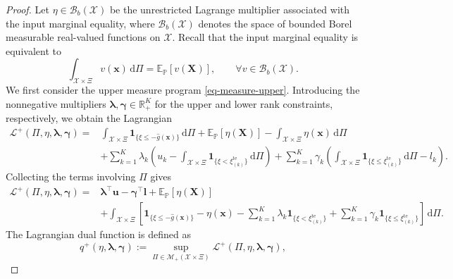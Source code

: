 \documentclass[review,11pt,3p,authoryear,nopreprintline]{elsarticle}
\begin{document}
\begin{proof}
  Let $\eta\in\mathcal B_b(\mathcal X)$ be the unrestricted Lagrange multiplier associated with the input marginal equality, where $\mathcal B_b(\mathcal X)$ denotes the space of bounded Borel measurable real-valued functions on $\mathcal X$. Recall that the input marginal equality is equivalent to
  \begin{equation*}
    \int_{\mathcal X\times\Xi}v(\bm x)\,\mathrm d\Pi
    =\mathbb E_{\mathbb P}\left[v(\bm X)\right],
    \qquad\forall v\in\mathcal B_b(\mathcal X).
  \end{equation*}
  We first consider the upper measure program \eqref{eq-measure-upper}. Introducing the nonnegative multipliers $\bm\lambda,\bm\gamma\in\mathbb R_+^K$ for the upper and lower rank constraints, respectively, we obtain the Lagrangian \citep[Section~5.1]{B.V04}
  \begin{equation}
    \begin{aligned}
      \mathcal L^+(\Pi,\eta,\bm\lambda,\bm\gamma) = & \int_{\mathcal X\times\Xi}\mathbf1_{\{\xi\le-\hat g(\bm x)\}}\,\mathrm d\Pi +\mathbb E_{\mathbb P}\left[\eta(\bm X)\right]-\int_{\mathcal X\times\Xi}\eta(\bm x)\,\mathrm d\Pi\\
      &+\sum_{k=1}^K\lambda_k\left(u_k-\int_{\mathcal X\times\Xi}\mathbf1_{\{\xi<\xi_{(k)}^{\mathrm{te}}\}}\,\mathrm d\Pi\right) +\sum_{k=1}^K\gamma_k\left(\int_{\mathcal X\times\Xi}\mathbf1_{\{\xi\le\xi_{(k)}^{\mathrm{te}}\}}\,\mathrm d\Pi-l_k\right).
    \end{aligned}
    \label{eq-upper-lagrangian-expanded}
  \end{equation}
  Collecting the terms involving $\Pi$ gives
  \begin{equation}
    \begin{aligned}
      \mathcal L^+(\Pi,\eta,\bm\lambda,\bm\gamma)
      ={}&\bm\lambda^\top\bm u-\bm\gamma^\top\bm l+\mathbb E_{\mathbb P}\left[\eta(\bm X)\right]\\
      &+\int_{\mathcal X\times\Xi}\left[ \mathbf1_{\{\xi\le-\hat g(\bm x)\}}-\eta(\bm x) -\sum_{k=1}^K\lambda_k\mathbf1_{\{\xi<\xi_{(k)}^{\mathrm{te}}\}} +\sum_{k=1}^K\gamma_k\mathbf1_{\{\xi\le\xi_{(k)}^{\mathrm{te}}\}} 
      \right]\,\mathrm d\Pi.
    \end{aligned}
    \label{eq-upper-lagrangian}
  \end{equation}
  The Lagrangian dual function is defined as
  \begin{equation}
    q^+(\eta,\bm\lambda,\bm\gamma)
    :=\sup_{\Pi\in\mathcal M_+(\mathcal X\times\Xi)}\mathcal L^+(\Pi,\eta,\bm\lambda,\bm\gamma),

\end{equation}
\end{proof}
\end{document}
